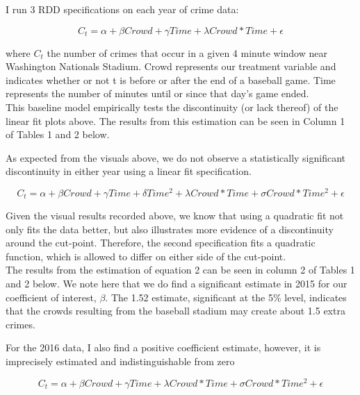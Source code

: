 \documentclass{article}
\begin{document}
I run 3 RDD specifications on each year of crime data:

\begin{equation}
C_t = \alpha + \beta Crowd + \gamma Time + \lambda Crowd * Time + \epsilon
\end{equation}

where $C_t$ the number of crimes that occur in a given 4 minute window near Washington Nationals Stadium. Crowd represents our treatment variable and indicates whether or not t is before or after the end of a baseball game. Time represents the number of minutes until or since that day's game ended.\\

This baseline model empirically tests the discontinuity (or lack thereof) of the linear fit plots above. The results from this estimation can be seen in Column 1 of Tables 1 and 2 below.

As expected from the visuals above, we do not observe a statistically significant discontinuity in either year using a linear fit specification.

\begin{equation}
C_t = \alpha + \beta Crowd + \gamma Time + \delta Time^2 +  \lambda Crowd * Time + \sigma Crowd * Time^2 + \epsilon
\end{equation}
 
Given the visual results recorded above, we know that using a quadratic fit not only fits the data better, but also illustrates more evidence of a discontinuity around the cut-point.  Therefore, the second specification fits a quadratic function, which is allowed to differ on either side of the cut-point.\\

The results from the estimation of equation 2 can be seen in column 2 of Tables 1 and 2 below. We note here that we do find a significant estimate in 2015 for our coefficient of interest, $\beta$. The 1.52 estimate, significant at the 5\% level, indicates that the crowds resulting from the baseball stadium may create about 1.5 extra crimes.

For the 2016 data, I also find a positive coefficient estimate, however, it is imprecisely estimated and indistinguishable from zero



\begin{equation}
C_t = \alpha + \beta Crowd + \gamma Time +  \lambda Crowd * Time + \sigma Crowd * Time^2 + \epsilon
\end{equation}
 
\end{document}
